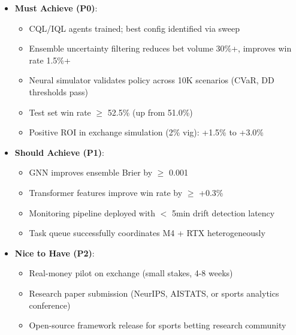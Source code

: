 \begin{itemize}
  \item \textbf{Must Achieve (P0)}:
  \begin{itemize}
    \item CQL/IQL agents trained; best config identified via sweep
    \item Ensemble uncertainty filtering reduces bet volume 30\%+, improves win rate 1.5\%+
    \item Neural simulator validates policy across 10K scenarios (CVaR, DD thresholds pass)
    \item Test set win rate $\ge$ 52.5\% (up from 51.0\%)
    \item Positive ROI in exchange simulation (2\% vig): +1.5\% to +3.0\%
  \end{itemize}
  \item \textbf{Should Achieve (P1)}:
  \begin{itemize}
    \item GNN improves ensemble Brier by $\ge$ 0.001
    \item Transformer features improve win rate by $\ge$ +0.3\%
    \item Monitoring pipeline deployed with $<$ 5min drift detection latency
    \item Task queue successfully coordinates M4 + RTX heterogeneously
  \end{itemize}
  \item \textbf{Nice to Have (P2)}:
  \begin{itemize}
    \item Real-money pilot on exchange (small stakes, 4-8 weeks)
    \item Research paper submission (NeurIPS, AISTATS, or sports analytics conference)
    \item Open-source framework release for sports betting research community
  \end{itemize}
\end{itemize}

